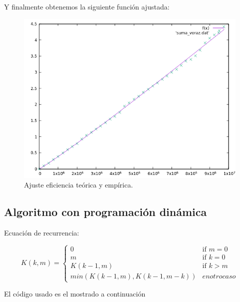 Y finalmente obtenemos la siguiente función ajustada:
\begin{figure}[H]
    \begin{center}
        \includegraphics[scale=0.7]{imagenes/suma_voraz_adj.png}
        \caption{Ajuste eficiencia teórica y empírica.}
        \label{fig3}
    \end{center}
\end{figure}




\subsection{Algoritmo con programación dinámica}


Ecuación de recurrencia:

\begin{equation}
    K(k,m) =
\left\{
	\begin{array}{ll}
		0 & \mbox{if } m = 0 \\
		m & \mbox{if } k = 0 \\
		K(k-1,m) & \mbox{if } k > m \\
	    min( K(k-1,m), K(k-1,m-k)) & en otro caso
	\end{array}
\right.
\end{equation}



El código usado es el mostrado a continuación

